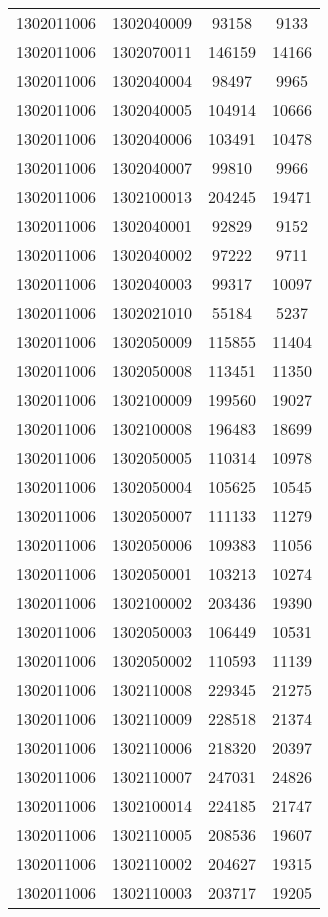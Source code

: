 \begin{longtable}[h]{llcc}
		1302011006 & 1302040009 & 93158 & 9133\\
		1302011006 & 1302070011 & 146159 & 14166\\
		1302011006 & 1302040004 & 98497 & 9965\\
		1302011006 & 1302040005 & 104914 & 10666\\
		1302011006 & 1302040006 & 103491 & 10478\\
		1302011006 & 1302040007 & 99810 & 9966\\
		1302011006 & 1302100013 & 204245 & 19471\\
		1302011006 & 1302040001 & 92829 & 9152\\
		1302011006 & 1302040002 & 97222 & 9711\\
		1302011006 & 1302040003 & 99317 & 10097\\
		1302011006 & 1302021010 & 55184 & 5237\\
		1302011006 & 1302050009 & 115855 & 11404\\
		1302011006 & 1302050008 & 113451 & 11350\\
		1302011006 & 1302100009 & 199560 & 19027\\
		1302011006 & 1302100008 & 196483 & 18699\\
		1302011006 & 1302050005 & 110314 & 10978\\
		1302011006 & 1302050004 & 105625 & 10545\\
		1302011006 & 1302050007 & 111133 & 11279\\
		1302011006 & 1302050006 & 109383 & 11056\\
		1302011006 & 1302050001 & 103213 & 10274\\
		1302011006 & 1302100002 & 203436 & 19390\\
		1302011006 & 1302050003 & 106449 & 10531\\
		1302011006 & 1302050002 & 110593 & 11139\\
		1302011006 & 1302110008 & 229345 & 21275\\
		1302011006 & 1302110009 & 228518 & 21374\\
		1302011006 & 1302110006 & 218320 & 20397\\
		1302011006 & 1302110007 & 247031 & 24826\\
		1302011006 & 1302100014 & 224185 & 21747\\
		1302011006 & 1302110005 & 208536 & 19607\\
		1302011006 & 1302110002 & 204627 & 19315\\
		1302011006 & 1302110003 & 203717 & 19205\\

\end{longtable}
